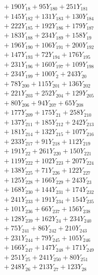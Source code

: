 \documentclass[a4paper,10pt]{article}
\begin{document}
{\begin{align}
&\quad  + 190Y_{18} + 95Y_{180} + 251Y_{181} \\[0.5ex]
&\quad  + 145Y_{182} + 131Y_{183} + 130Y_{184} \\[0.5ex]
&\quad  + 222Y_{185} + 192Y_{186} + 179Y_{187} \\[0.5ex]
&\quad  + 183Y_{188} + 234Y_{189} + 158Y_{19} \\[0.5ex]
&\quad  + 196Y_{190} + 106Y_{191} + 200Y_{192} \\[0.5ex]
&\quad  + 147Y_{193} + 72Y_{194} + 176Y_{195} \\[0.5ex]
&\quad  + 231Y_{196} + 160Y_{197} + 109Y_{198} \\[0.5ex]
&\quad  + 234Y_{199} + 100Y_{2} + 243Y_{20} \\[0.5ex]
&\quad  + 78Y_{200} + 115Y_{201} + 136Y_{202} \\[0.5ex]
&\quad  + 221Y_{203} + 252Y_{204} + 129Y_{205} \\[0.5ex]
&\quad  + 80Y_{206} + 94Y_{207} + 65Y_{208} \\[0.5ex]
&\quad  + 177Y_{209} + 175Y_{21} + 258Y_{210} \\[0.5ex]
&\quad  + 137Y_{211} + 185Y_{212} + 242Y_{213} \\[0.5ex]
&\quad  + 181Y_{214} + 132Y_{215} + 107Y_{216} \\[0.5ex]
&\quad  + 233Y_{217} + 91Y_{218} + 112Y_{219} \\[0.5ex]
&\quad  + 191Y_{22} + 261Y_{220} + 150Y_{221} \\[0.5ex]
&\quad  + 119Y_{222} + 102Y_{223} + 207Y_{224} \\[0.5ex]
&\quad  + 138Y_{225} + 71Y_{226} + 122Y_{227} \\[0.5ex]
&\quad  + 125Y_{228} + 166Y_{229} + 243Y_{23} \\[0.5ex]
&\quad  + 168Y_{230} + 144Y_{231} + 174Y_{232} \\[0.5ex]
&\quad  + 241Y_{233} + 191Y_{234} + 154Y_{235} \\[0.5ex]
&\quad  + 101Y_{236} + 66Y_{237} + 156Y_{238} \\[0.5ex]
&\quad  + 128Y_{239} + 162Y_{24} + 234Y_{240} \\[0.5ex]
&\quad  + 75Y_{241} + 86Y_{242} + 210Y_{243} \\[0.5ex]
&\quad  + 231Y_{244} + 79Y_{245} + 105Y_{246} \\[0.5ex]
&\quad  + 166Y_{247} + 147Y_{248} + 171Y_{249} \\[0.5ex]
&\quad  + 251Y_{25} + 241Y_{250} + 80Y_{251} \\[0.5ex]
&\quad  + 248Y_{26} + 213Y_{27} + 123Y_{28} \\[0.5ex]

\end{align}}
\end{document}

